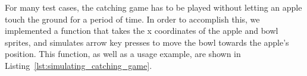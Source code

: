 %
%
%
%
%

For many test cases, the catching game has to be played without letting an apple touch the ground for a period of time.
In order to accomplish this, we implemented a function
that takes the x coordinates of the apple and bowl sprites,
and simulates arrow key presses to move the bowl towards the apple's position.
This function, as well as a usage example, are shown in Listing~\ref{lst:simulating_catching_game}.

